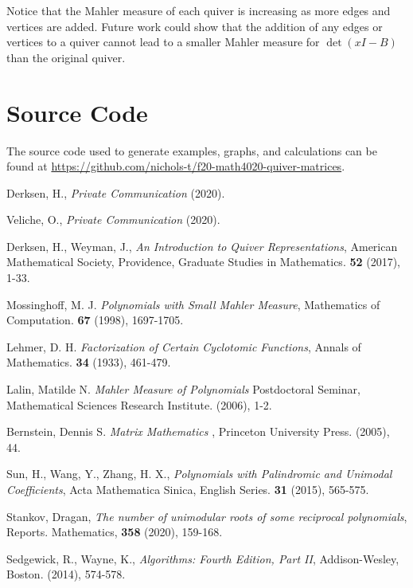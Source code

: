\documentclass{amsart}
\theoremstyle{theorem}
\theoremstyle{theorem*}
\theoremstyle{definition}
\begin{document}
Notice that the Mahler measure of each quiver is increasing as more edges and vertices
are added. Future work could show that the addition of any edges or
vertices to a quiver cannot lead to a smaller
Mahler measure for $\det(xI - B)$ than the original quiver.

\appendix
\section{Source Code}

The source code used to generate examples, graphs, and calculations can
be found at
\textcolor{blue}{\url{https://github.com/nichols-t/f20-math4020-quiver-matrices}}.
\begin{thebibliography}{99}

     Derksen, H., {\em Private Communication} (2020).

     Veliche, O., {\em Private Communication} (2020).

     Derksen, H., Weyman, J., {\em An Introduction to Quiver
            Representations\/}, American Mathematical Society, Providence,
    Graduate Studies in Mathematics. {\bf 52} (2017), 1-33.

     Mossinghoff, M. J. {\em Polynomials with Small Mahler
            Measure\/}, Mathematics of Computation. {\bf 67} (1998), 1697-1705.

     Lehmer, D. H. {\em Factorization of Certain Cyclotomic
            Functions\/}, Annals of Mathematics. {\bf 34} (1933), 461-479.

     Lalin, Matilde N. {\em Mahler Measure of Polynomials\/}
    Postdoctoral Seminar, Mathematical Sciences Research Institute. (2006), 1-2.

     Bernstein, Dennis S. {\em Matrix Mathematics \/},
    Princeton University Press. (2005), 44.

     Sun, H., Wang, Y., Zhang, H. X., {\em Polynomials with
            Palindromic and Unimodal Coefficients}, Acta Mathematica Sinica, English
    Series. {\bf 31} (2015), 565-575.

     Stankov, Dragan, {\em The number of unimodular roots of some
            reciprocal polynomials}, Reports. Mathematics, {\bf 358} (2020), 159-168.

     Sedgewick, R., Wayne, K., {\em Algorithms: Fourth Edition,
            Part II\/}, Addison-Wesley, Boston. (2014), 574-578.

\end{thebibliography}
\end{document}
